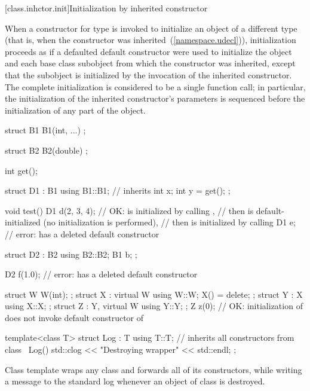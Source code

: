 [class.inhctor.init]{Initialization by inherited constructor}%

\pnum
When a constructor for type  is invoked
to initialize an object of a different type 
(that is, when the constructor was inherited~(\ref{namespace.udecl})),
initialization proceeds as if a defaulted default constructor
were used to initialize the  object and
each base class subobject from which the constructor was inherited,
except that the  subobject is initialized
by the invocation of the inherited constructor.
The complete initialization is considered to be a single function call;
in particular, the initialization of the inherited constructor's parameters
is sequenced before the initialization of any part of the  object.
\begin{example}
\begin{codeblock}
struct B1 {
  B1(int, ...) { }
};

struct B2 {
  B2(double) { }
};

int get();

struct D1 : B1 {
  using B1::B1;  // inherits 
  int x;
  int y = get();
};

void test() {
  D1 d(2, 3, 4); // OK:  is initialized by calling ,
                 // then  is default-initialized (no initialization is performed),
                 // then  is initialized by calling 
  D1 e;          // error:  has a deleted default constructor
}

struct D2 : B2 {
  using B2::B2;
  B1 b;
};

D2 f(1.0);       // error:  has a deleted default constructor

struct W { W(int); };
struct X : virtual W { using W::W; X() = delete; };
struct Y : X { using X::X; };
struct Z : Y, virtual W { using Y::Y; };
Z z(0); // OK: initialization of  does not invoke default constructor of 

template<class T> struct Log : T {
  using T::T;    // inherits all constructors from class 
  ~Log() { std::clog << "Destroying wrapper" << std::endl; }
};
\end{codeblock}
Class template  wraps any class and forwards all of its constructors,
while writing a message to the standard log
whenever an object of class  is destroyed.
\end{example}

